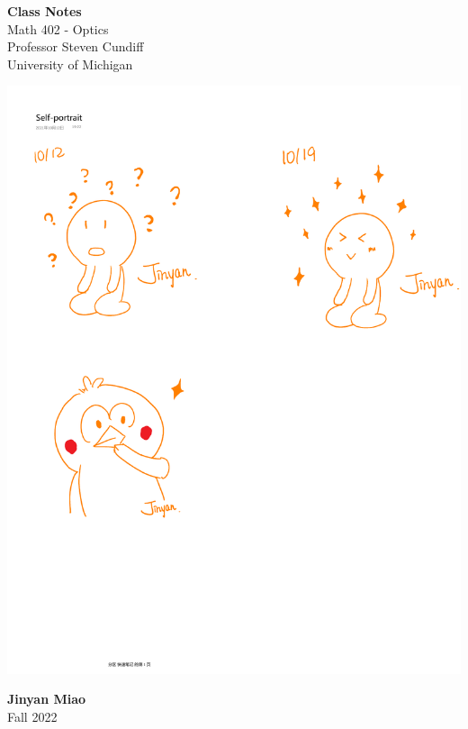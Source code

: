 \documentclass[11pt]{book}
\theoremstyle{break}
\theoremstyle{break}
\begin{document}
	\begin{titlepage}
		\begin{center}
			\vspace*{1cm}
			\Huge \color{red}
				\textbf{Class Notes}\\
			\vspace{0.5cm}			
			\Large \color{black}
				Math 402 - Optics\\
				Professor Steven Cundiff\\	
				University of Michigan\\
			\vspace{2cm}

			\includegraphics[scale=0.85]{hmm.pdf}
			
			
			\vspace{4cm}
			\LARGE
				\textbf{Jinyan Miao}\\
				\hfill\break
				\LARGE Fall 2022\\
			\vspace{1cm}

		\vspace*{\fill}
		\end{center}			
	\end{titlepage}
\end{document}
